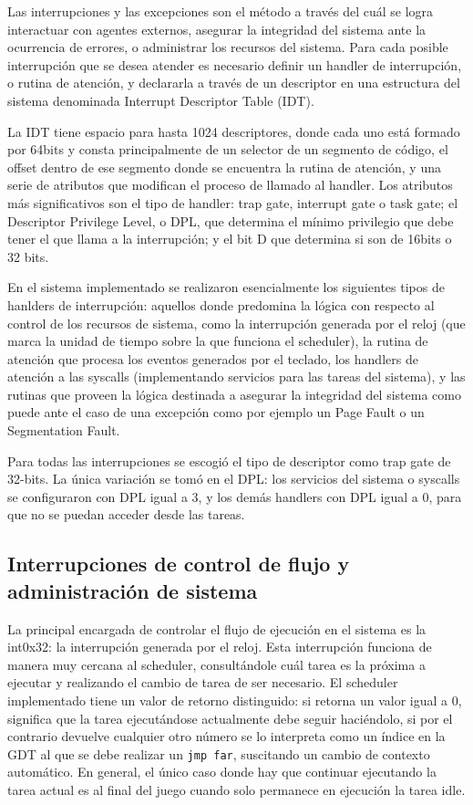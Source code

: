 	Las interrupciones y las excepciones son el método a través del cuál 
se logra interactuar con agentes externos, asegurar la integridad del sistema 
ante la ocurrencia de errores, o administrar los recursos del sistema. Para cada 
posible interrupción que se desea atender es necesario definir un handler de 
interrupción, o rutina de atención, y declararla a través de un descriptor
en una estructura del sistema denominada Interrupt Descriptor Table (IDT).

	La IDT tiene espacio para hasta 1024 descriptores, donde cada uno está formado 
por 64bits y consta principalmente de un selector de un segmento de código, el offset 
dentro de ese segmento donde se encuentra la rutina de atención, y una serie de atributos 
que modifican el proceso de llamado al handler. Los atributos más significativos son 
el tipo de handler: trap gate, interrupt gate o task gate; el Descriptor Privilege Level,
o DPL, que determina el mínimo privilegio que debe tener el que llama a la interrupción; y 
el bit D que determina si son de 16bits o 32 bits.

	En el sistema implementado se realizaron esencialmente los siguientes tipos de 
hanlders de interrupción: aquellos donde predomina la lógica con respecto 
al control de los recursos de sistema, como la interrupción generada por el reloj 
(que marca la unidad de tiempo sobre la que funciona el scheduler), la rutina de atención 
que procesa los eventos generados por el teclado, los handlers de atención a las syscalls 
(implementando servicios para las tareas del sistema), y las rutinas que proveen la lógica 
destinada a asegurar la integridad del sistema como puede ante el caso de una excepción 
como por ejemplo un Page Fault o un Segmentation Fault.
	
	Para todas las interrupciones se escogió el tipo de descriptor como trap gate de 32-bits. 
La única variación se tomó en el DPL: los servicios del sistema o syscalls se configuraron con DPL igual a 3, y los demás handlers con DPL igual a 0, para que no se puedan acceder desde las tareas.

\subsection{Interrupciones de control de flujo y administración de sistema}

	La principal encargada de controlar el flujo de ejecución en el sistema es la int0x32: 
la interrupción generada por el reloj. Esta interrupción funciona de manera muy cercana 
al scheduler, consultándole cuál tarea es la próxima a ejecutar y realizando el cambio 
de tarea de ser necesario. El scheduler implementado tiene un valor de retorno distinguido: 
si retorna un valor igual a 0, significa que la tarea ejecutándose actualmente debe 
seguir haciéndolo, si por el contrario devuelve cualquier otro número se lo interpreta 
como un índice en la GDT al que se debe realizar un \texttt{jmp far}, suscitando un 
cambio de contexto automático. En general, el único caso donde hay que continuar ejecutando 
la tarea actual es al final del juego cuando solo permanece en ejecución la tarea idle.

